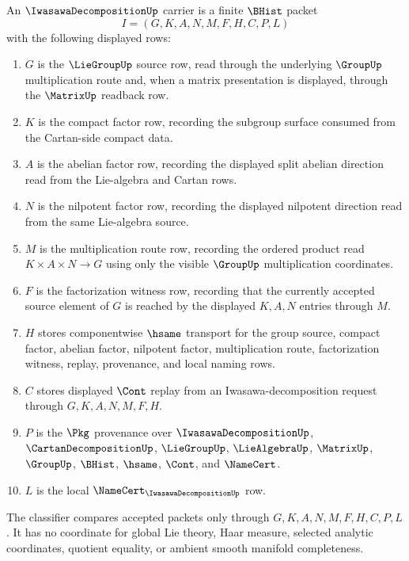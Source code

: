 \begin{definition}
\label{def:iwasawa-decomposition-carrier}
An $\IwasawaDecompositionUp$ carrier is a finite $\BHist$ packet
$$
I=(G,K,A,N,M,F,H,C,P,L)
$$
with the following displayed rows:
\begin{enumerate}
\item $G$ is the $\LieGroupUp$ source row, read through the underlying $\GroupUp$ multiplication route and, when a matrix presentation is displayed, through the $\MatrixUp$ readback row.
\item $K$ is the compact factor row, recording the subgroup surface consumed from the Cartan-side compact data.
\item $A$ is the abelian factor row, recording the displayed split abelian direction read from the Lie-algebra and Cartan rows.
\item $N$ is the nilpotent factor row, recording the displayed nilpotent direction read from the same Lie-algebra source.
\item $M$ is the multiplication route row, recording the ordered product read $K \times A \times N \to G$ using only the visible $\GroupUp$ multiplication coordinates.
\item $F$ is the factorization witness row, recording that the currently accepted source element of $G$ is reached by the displayed $K,A,N$ entries through $M$.
\item $H$ stores componentwise $\hsame$ transport for the group source, compact factor, abelian factor, nilpotent factor, multiplication route, factorization witness, replay, provenance, and local naming rows.
\item $C$ stores displayed $\Cont$ replay from an Iwasawa-decomposition request through $G,K,A,N,M,F,H$.
\item $P$ is the $\Pkg$ provenance over $\IwasawaDecompositionUp$, $\CartanDecompositionUp$, $\LieGroupUp$, $\LieAlgebraUp$, $\MatrixUp$, $\GroupUp$, $\BHist$, $\hsame$, $\Cont$, and $\NameCert$.
\item $L$ is the local $\NameCert_{\IwasawaDecompositionUp}$ row.
\end{enumerate}
The classifier compares accepted packets only through $G,K,A,N,M,F,H,C,P,L$. It has no coordinate for global Lie theory, Haar measure, selected analytic coordinates, quotient equality, or ambient smooth manifold completeness.
\end{definition}

